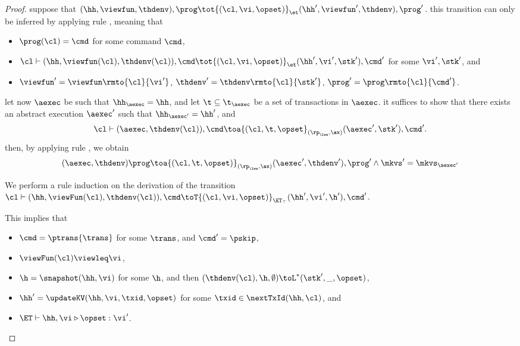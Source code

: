 \begin{proof}
suppose that $(\hh, \viewfun, \thdenv), \prog \tot{(\cl, \vi, \opset)}_{\et} (\hh', \viewfun', \thdenv), \prog'$. 
this transition can only be inferred by applying rule , meaning that 
\begin{itemize}
\item $\prog(\cl) = \cmd$ for some command $\cmd$, 
\item $\cl \vdash (\hh, \viewfun(\cl), \thdenv(\cl)), \cmd \tot{(\cl, \vi, \opset)}_{\et} (\hh', \vi', \stk'), \cmd'$ 
for some $\vi', \stk'$, and 
\item $\viewfun' = \viewfun\rmto{\cl}{\vi'}$, $\thdenv' = \thdenv\rmto{\cl}{\stk'}$, $\prog' = \prog\rmto{\cl}{\cmd'}$. 
\end{itemize}
let now $\aexec$ be such that $\hh_{\aexec} = \hh$, and let $\t \subseteq \t_{\aexec}$ be a set of 
transactions in $\aexec$. it suffices to show that there exists an abstract execution $\aexec'$ such that 
$\hh_{\aexec'} = \hh'$, and 
\[
\cl \vdash (\aexec, \thdenv(\cl)), \cmd \toa{(\cl, \t , \opset}_{(\rp_{\lww}, \ax)} (\aexec', \stk'), \cmd'.
\]
then, by applying rule , we obtain 
\[ 
    (\aexec, \thdenv) \prog \toa{(\cl, \t, \opset)}_{(\rp_{\lww}, \ax)} (\aexec' ,\thdenv'), \prog' \land \mkvs' = \mkvs_{\aexec'}
\]

We perform a rule induction on the derivation of the transition $\cl \vdash (\hh, \viewFun(\cl), \thdenv(\cl)), \cmd \toT{(\cl, \vi, \opset)}_{\ET_{\top}} (\hh', \vi', \h'), \cmd'$. 

This implies that 
\begin{itemize}
\item $\cmd = \ptrans{\trans}$ for some $\trans$, and $\cmd' = \pskip$,
\item $\viewFun(\cl) \viewleq \vi$, 
\item $\h = \snapshot(\hh, \vi)$ for some \( \h \), and then $(\thdenv(\cl), \h, \emptyset) \toL^{\ast} (\stk', \_, \opset)$, 
\item $\hh' = \updateKV(\hh, \vi, \txid, \opset)$ for some $\txid \in \nextTxId(\hh, \cl)$, and
\item $\ET \vdash \hh, \vi \triangleright \opset: \vi'$.
\end{itemize}


\end{proof}
